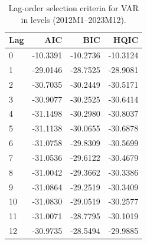 \begin{table}[H]
\centering
\caption{Lag-order selection criteria for VAR in levels (2012M1--2023M12).}
\label{tab:lag_selection}
\begin{tabular}{lrrr}
\toprule
Lag & AIC & BIC & HQIC \\
\midrule
0 & -10.3391 & -10.2736 & -10.3124 \\
1 & -29.0146 & -28.7525 & -28.9081 \\
2 & -30.7035 & -30.2449 & -30.5171 \\
3 & -30.9077 & -30.2525 & -30.6414 \\
4 & -31.1498 & -30.2980 & -30.8037 \\
5 & -31.1138 & -30.0655 & -30.6878 \\
6 & -31.0758 & -29.8309 & -30.5699 \\
7 & -31.0536 & -29.6122 & -30.4679 \\
8 & -31.0042 & -29.3662 & -30.3386 \\
9 & -31.0864 & -29.2519 & -30.3409 \\
10 & -31.0830 & -29.0519 & -30.2577 \\
11 & -31.0071 & -28.7795 & -30.1019 \\
12 & -30.9735 & -28.5494 & -29.9885 \\
\bottomrule
\end{tabular}
\end{table}
